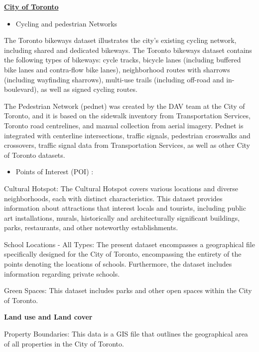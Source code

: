 \documentclass[
11pt, %
oneside, %
english, %
singlespacing, %
]{macthesis} %
\def\tightlist{}
\begin{document}
\textbf{\href{https://open.toronto.ca/catalogue/?search=point&sort=score\%20desc}{City of Toronto}}

\begin{itemize}
\tightlist
\item
  Cycling and pedestrian Networks
\end{itemize}

The Toronto bikeways dataset illustrates the city's existing cycling network, including shared and dedicated bikeways. The Toronto bikeways dataset contains the following types of bikeways: cycle tracks, bicycle lanes (including buffered bike lanes and contra-flow bike lanes), neighborhood routes with sharrows (including wayfinding sharrows), multi-use trails (including off-road and in-boulevard), as well as signed cycling routes.

The Pedestrian Network (pednet) was created by the DAV team at the City of Toronto, and it is based on the sidewalk inventory from Transportation Services, Toronto road centrelines, and manual collection from aerial imagery. Pednet is integrated with centerline intersections, traffic signals, pedestrian crosswalks and crossovers, traffic signal data from Transportation Services, as well as other City of Toronto datasets.

\begin{itemize}
\tightlist
\item
  Points of Interest (POI) :
\end{itemize}

Cultural Hotspot: The Cultural Hotspot covers various locations and diverse neighborhoods, each with distinct characteristics. This dataset provides information about attractions that interest locals and tourists, including public art installations, murals, historically and architecturally significant buildings, parks, restaurants, and other noteworthy establishments.

School Locations - All Types: The present dataset encompasses a geographical file specifically designed for the City of Toronto, encompassing the entirety of the points denoting the locations of schools. Furthermore, the dataset includes information regarding private schools.

Green Spaces: This dataset includes parks and other open spaces within the City of Toronto.

\textbf{Land use and Land cover}

Property Boundaries: This data is a GIS file that outlines the geographical area of all properties in the City of Toronto.
\end{document}
